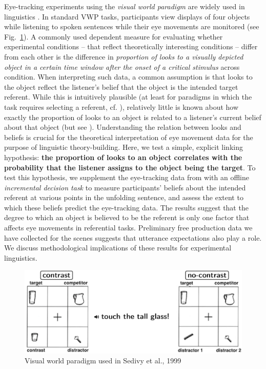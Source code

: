 \documentclass[10pt,letterpaper]{article}
\begin{document}
Eye-tracking experiments using the \emph{visual world paradigm} \cite<VWP,>{tanenhaus1995} are widely used in linguistics \cite{SedivyEtAl1999:Achieving-Incremental-Semantic-, LeffelXiangKennedy2016:Imprecision-is-Pragmatic-}. In standard VWP tasks, participants view displays of four objects while listening to spoken sentences while their eye movements are monitored (see Fig.~\ref{fig:sedivyetal}). A commonly used dependent measure for evaluating whether experimental conditions -- that reflect theoretically interesting conditions -- differ from each other is the difference in \emph{proportion of looks to a visually depicted object in a certain time window after the onset of a critical stimulus} across condition. When interpreting such data, a common assumption is that looks to the object reflect the listener's belief that the object is the intended target referent. While this is intuitively plausible (at least for paradigms in which the task requires selecting a referent, cf. ), relatively little is known about how exactly the proportion of looks to an object is related to a listener's current belief about that object (but see ). Understanding the relation between looks and beliefs is crucial for the theoretical interpretation of eye movement data for the purpose of linguistic theory-building. Here, we test a simple, explicit linking hypothesis: \textbf{the proportion of looks to an object correlates with the probability that the listener assigns to the object being the target}. 
To test this hypothesis, we supplement the eye-tracking data from  with an offline \emph{incremental decision task} to measure participants' beliefs about the intended referent at various points in the unfolding sentence, and assess the extent to which these beliefs predict the eye-tracking data.
The results suggest that the degree to which an object is believed to be the referent is only one factor that affects eye movements in referential tasks. 
Preliminary free production data we have collected for the scenes suggests that utterance expectations also play a role. 
We discuss methodological implications of these results for experimental linguistics.


\begin{figure}[h]
  \centering
  \includegraphics[width=.5\textwidth]{plots/SedivyEtAl1999.png}
  \caption{Visual world paradigm used in Sedivy et al., 1999}
  \label{fig:sedivyetal}
\end{figure}
\end{document}
